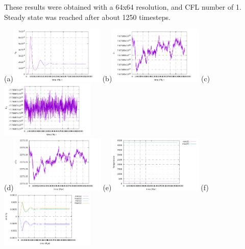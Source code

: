 These results were obtained with a 64x64 resolution, and CFL number of 1. Steady state was reached 
after about 1250 timesteps.

\begin{center}
(a)\includegraphics[width=4.5cm]{python_codes/fieldstone_24/BA_104/EK}
(b)\includegraphics[width=4.5cm]{python_codes/fieldstone_24/BA_104/ET}
(c)\includegraphics[width=4.5cm]{python_codes/fieldstone_24/BA_104/EG}\\
(d)\includegraphics[width=4.5cm]{python_codes/fieldstone_24/BA_104/Tavrg}
(e)\includegraphics[width=4.5cm]{python_codes/fieldstone_24/BA_104/T_stats}
(f)\includegraphics[width=4.5cm]{python_codes/fieldstone_24/BA_104/vel_stats}\\

\end{center}
